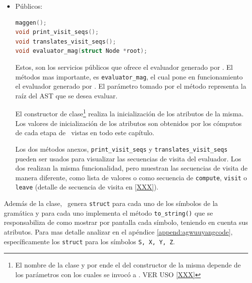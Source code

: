 \begin{description}
\begin{itemize}
El método \texttt{traverse} recorre el AST de entrada al evaluador y asigna a cada nodo un plan de evaluación\footnote{Los planes que asigna el método traverse son los generados estáticamente por \maggen.} y con ello una secuencia de visita correspondiente.

\texttt{add\_plan} y \texttt{add\_plan\_project} agregan planes y planes proyectados respectivamente, los mismos son usados en la inicialización del evaluador (constructor de clase).

\item Públicos:

\vspace{0.3cm}
\begin{lstlisting}[basicstyle=\scriptsize, backgroundcolor=\color{white}, language=c++, columns=fullflexible, linewidth=6cm]
maggen();
void print_visit_seqs();
void translates_visit_seqs();
void evaluator_mag(struct Node *root);
\end{lstlisting}
\vspace{0.3cm}

Estos, son los servicios públicos que ofrece el evaluador generado por \maggen. El métodos mas importante, es \texttt{evaluator\_mag}, el cual pone en funcionamiento el evaluador generado por \maggen. El parámetro tomado por el método representa la raíz del AST que se desea evaluar.

El constructor de clase\footnote{El nombre de la clase y por ende el del constructor de la misma depende de los parámetros con los cuales se invocó a \maggen. VER USO \ref{XXX}} realiza la inicialización de los atributos de la misma. Los valores de inicialización de los atributos son obtenidos por los cómputos de cada etapa de \maggen\ vistas en todo este capítulo.

Los dos métodos anexos, \texttt{print\_visit\_seqs} y \texttt{translates\_visit\_seqs} pueden ser usados para visualizar las secuencias de visita del evaluador. Los dos realizan la misma funcionalidad, pero muestran las secuencias de visita de manera diferente, como lista de valores o como secuencia de \texttt{compute}, \texttt{visit} o \texttt{leave} (detalle de secuencia de visita en \ref{XXX}).
\end{itemize}
\end{description}

Además de la clase, \maggen\ genera \texttt{struct} para cada uno de los símbolos de la gramática y para cada uno implementa el método \texttt{to\_string()} que se responsabiliza de como mostrar por pantalla cada símbolo, teniendo en cuenta sus atributos. Para mas detalle analizar en el apéndice \ref{append:agwuuyangcode}, específicamente los \texttt{struct} para los símbolos \texttt{S, X, Y, Z}.


